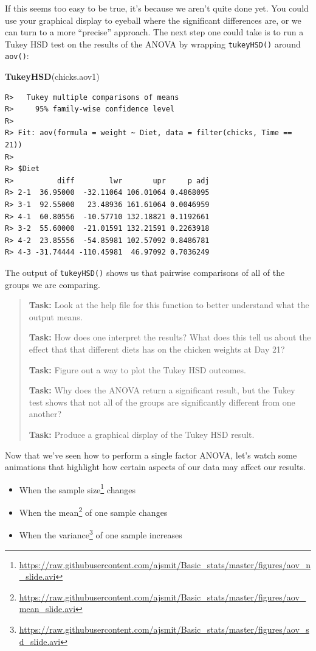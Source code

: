 \documentclass[english,10pt,a4paper,oneside]{book}
\renewcommand{\href}[2]{#2\footnote{\url{#1}}}
\let\rmarkdownfootnote\footnote%
\def\footnote{\protect\rmarkdownfootnote}
\providecommand{\tightlist}{%
  \setlength{\itemsep}{0pt}\setlength{\parskip}{0pt}}
\newenvironment{Shaded}{\begin{snugshade}}{\end{snugshade}}
\newcommand{\KeywordTok}[1]{\textcolor[rgb]{0.13,0.29,0.53}{\textbf{#1}}}
\newcommand{\NormalTok}[1]{#1}
\theoremstyle{definition}
\theoremstyle{definition}
\theoremstyle{definition}
\theoremstyle{remark}
\begin{document}
If this seems too easy to be true, it's because we aren't quite done
yet. You could use your graphical display to eyeball where the
significant differences are, or we can turn to a more \enquote{precise}
approach. The next step one could take is to run a Tukey HSD test on the
results of the ANOVA by wrapping \texttt{tukeyHSD()} around
\texttt{aov()}:

\begin{Shaded}
\begin{Highlighting}[]
\KeywordTok{TukeyHSD}\NormalTok{(chicks.aov1)}
\end{Highlighting}
\end{Shaded}

\begin{verbatim}
R>   Tukey multiple comparisons of means
R>     95% family-wise confidence level
R> 
R> Fit: aov(formula = weight ~ Diet, data = filter(chicks, Time == 21))
R> 
R> $Diet
R>          diff        lwr       upr     p adj
R> 2-1  36.95000  -32.11064 106.01064 0.4868095
R> 3-1  92.55000   23.48936 161.61064 0.0046959
R> 4-1  60.80556  -10.57710 132.18821 0.1192661
R> 3-2  55.60000  -21.01591 132.21591 0.2263918
R> 4-2  23.85556  -54.85981 102.57092 0.8486781
R> 4-3 -31.74444 -110.45981  46.97092 0.7036249
\end{verbatim}

The output of \texttt{tukeyHSD()} shows us that pairwise comparisons of
all of the groups we are comparing.

\begin{quote}
\textbf{Task:} Look at the help file for this function to better
understand what the output means.

\textbf{Task:} How does one interpret the results? What does this tell
us about the effect that that different diets has on the chicken weights
at Day 21?

\textbf{Task:} Figure out a way to plot the Tukey HSD outcomes.

\textbf{Task:} Why does the ANOVA return a significant result, but the
Tukey test shows that not all of the groups are significantly different
from one another?

\textbf{Task:} Produce a graphical display of the Tukey HSD result.
\end{quote}

Now that we've seen how to perform a single factor ANOVA, let's watch
some animations that highlight how certain aspects of our data may
affect our results.

\begin{itemize}
\tightlist
\item
  When the
  \href{https://raw.githubusercontent.com/ajsmit/Basic_stats/master/figures/aov_n_slide.avi}{sample
  size} changes
\item
  When the
  \href{https://raw.githubusercontent.com/ajsmit/Basic_stats/master/figures/aov_mean_slide.avi}{mean}
  of one sample changes
\item
  When the
  \href{https://raw.githubusercontent.com/ajsmit/Basic_stats/master/figures/aov_sd_slide.avi}{variance}
  of one sample increases
\end{itemize}
\end{document}
